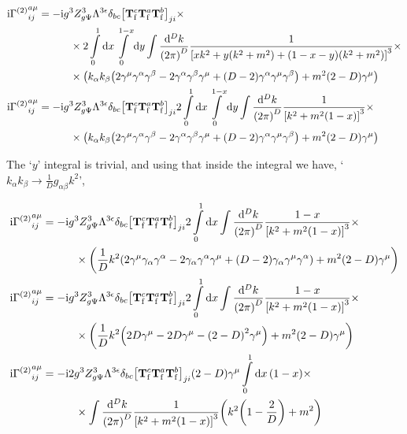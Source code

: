 \begin{align}
    \textnormal{i}{\Gamma^{\qty(2)}}^{a\mu}_{ij}&=-\textnormal{i} g^3Z_{g\Psi}^3\Lambda^{3\epsilon}\delta_{bc}
    \qty[{\vb T^c_{\textnormal{f}}}{\vb T^a_{\textnormal{f}}}{\vb T^b_{\textnormal{f}}}]_{ji}\times\nonumber\\
    &\quad\quad\quad\times2\int\limits_0^1\dd{x}\int\limits_0^{1-x}\dd{y}\int\frac{\dd[D]{k}}{\qty(2\pi)^D}\frac{1}{\qty[xk^2+y\qty(k^2+m^2)+\qty(1-x-y)\qty(k^2+m^2)]^3}\times\nonumber\\
    &\quad\quad\quad\times\qty(k_\alpha k_\beta\qty(2\gamma^\mu\gamma^\alpha\gamma^\beta-2\gamma^\alpha\gamma^\beta\gamma^\mu
    +\qty(D-2)\gamma^\alpha\gamma^\mu\gamma^\beta)+m^2\qty(2-D)\gamma^\mu)\nonumber\\
    \textnormal{i}{\Gamma^{\qty(2)}}^{a\mu}_{ij}&=-\textnormal{i} g^3Z_{g\Psi}^3\Lambda^{3\epsilon}\delta_{bc}
    \qty[{\vb T^c_{\textnormal{f}}}{\vb T^a_{\textnormal{f}}}{\vb T^b_{\textnormal{f}}}]_{ji}2\int\limits_0^1\dd{x}\int\limits_0^{1-x}\dd{y}\int\frac{\dd[D]{k}}{\qty(2\pi)^D}\frac{1}{\qty[k^2+m^2\qty(1-x)]^3}\times\nonumber\\
    &\quad\quad\quad\times\qty(k_\alpha k_\beta\qty(2\gamma^\mu\gamma^\alpha\gamma^\beta-2\gamma^\alpha\gamma^\beta\gamma^\mu
    +\qty(D-2)\gamma^\alpha\gamma^\mu\gamma^\beta)+m^2\qty(2-D)\gamma^\mu)\nonumber
\end{align}

The `$y$' integral is trivial, and using that inside the integral we have, 
`$k_\alpha k_\beta\rightarrow\frac1D g_{\alpha\beta}k^2$',

\begin{align}
    \textnormal{i}{\Gamma^{\qty(2)}}^{a\mu}_{ij}&=-\textnormal{i} g^3Z_{g\Psi}^3\Lambda^{3\epsilon}\delta_{bc}
    \qty[{\vb T^c_{\textnormal{f}}}{\vb T^a_{\textnormal{f}}}{\vb T^b_{\textnormal{f}}}]_{ji}2\int\limits_0^1\dd{x}\int\frac{\dd[D]{k}}{\qty(2\pi)^D}\frac{1-x}{\qty[k^2+m^2\qty(1-x)]^3}\times\nonumber\\
    &\quad\quad\quad\times\qty(\frac1Dk^2\qty(2\gamma^\mu\gamma_\alpha\gamma^\alpha-2\gamma_\alpha\gamma^\alpha\gamma^\mu
    +\qty(D-2)\gamma_\alpha\gamma^\mu\gamma^\alpha)+m^2\qty(2-D)\gamma^\mu)\nonumber\\
    \textnormal{i}{\Gamma^{\qty(2)}}^{a\mu}_{ij}&=-\textnormal{i} g^3Z_{g\Psi}^3\Lambda^{3\epsilon}\delta_{bc}
    \qty[{\vb T^c_{\textnormal{f}}}{\vb T^a_{\textnormal{f}}}{\vb T^b_{\textnormal{f}}}]_{ji}2\int\limits_0^1\dd{x}\int\frac{\dd[D]{k}}{\qty(2\pi)^D}\frac{1-x}{\qty[k^2+m^2\qty(1-x)]^3}\times\nonumber\\
    &\quad\quad\quad\times\qty(\frac1Dk^2\qty(2D\gamma^\mu -2D\gamma^\mu
    -\qty(2-D)^2\gamma^\mu)+m^2\qty(2-D)\gamma^\mu)\nonumber\\
    \textnormal{i}{\Gamma^{\qty(2)}}^{a\mu}_{ij}&=-\textnormal{i}2 g^3Z_{g\Psi}^3\Lambda^{3\epsilon}\delta_{bc}
    \qty[{\vb T^c_{\textnormal{f}}}{\vb T^a_{\textnormal{f}}}{\vb T^b_{\textnormal{f}}}]_{ji}\qty(2-D)\gamma^\mu
    \int\limits_0^1\dd{x}\qty(1-x)\times\nonumber\\
    &\quad\quad\quad\times\int\frac{\dd[D]{k}}{\qty(2\pi)^D}\frac{1}{\qty[k^2+m^2\qty(1-x)]^3}
    \qty(k^2\qty(1-\frac2D)+m^2)\nonumber
\end{align}

